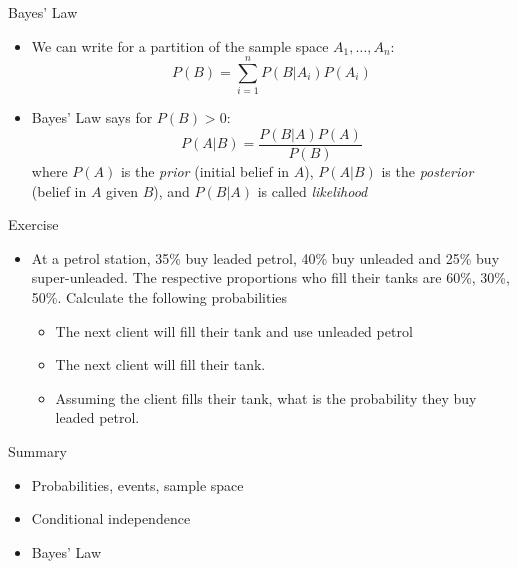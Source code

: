 \documentclass{beamer}
\begin{document}
\begin{frame}{Bayes' Law} 
\begin{itemize}
 \item We can write for a partition of the sample space $A_1, \ldots, A_n$: 
\begin{displaymath}
 P(B) = \sum_{i=1}^n P(B | A_i) P(A_i)
\end{displaymath}
\item Bayes' Law says for $P(B)>0$: 
\begin{displaymath}
 P(A | B) = \frac{P(B | A)P(A)}{P(B)}
\end{displaymath}
where $P(A)$ is the \emph{prior} (initial belief in $A$), $P(A|B)$ is the \emph{posterior} (belief in $A$ given $B$), and $P(B | A)$ is called \emph{likelihood} 
\end{itemize}
\end{frame}

\begin{frame}{Exercise} 
 \begin{itemize} 
  \item At a petrol station, 35\% buy leaded petrol, 40\% buy unleaded and 25\% buy super-unleaded. The respective proportions who fill their tanks are 60\%, 30\%, 50\%. Calculate the following probabilities 
\begin{itemize}
\item  The next client will fill their tank and use unleaded petrol 
\item The next client will fill their tank. 
\item Assuming the client fills their tank, what is the probability they buy leaded petrol. 
\end{itemize}
 \end{itemize}
\end{frame}

\begin{frame}{Summary}
 \begin{itemize} 
  \item Probabilities, events, sample space  
  \item Conditional independence
  \item Bayes' Law 
 \end{itemize}

\end{frame}
\end{document}
